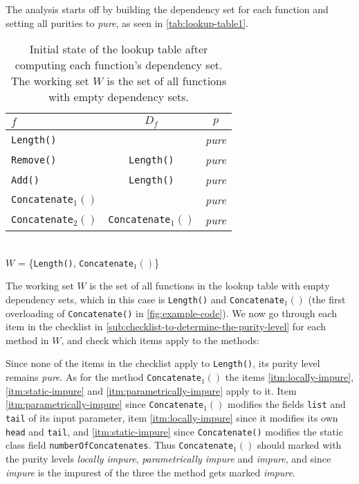 \documentclass[a4paper,12pt]{article}
\begin{document}
The analysis starts off by building the dependency set for each function and setting all purities to \textit{pure}, as seen in \autoref{tab:lookup-table1}.

\begin{table}[H]
  \caption{Initial state of the lookup table after computing each function's dependency set. The working set $W$ is the set of all functions with empty dependency sets.}
  \label{tab:lookup-table1}
  \centering
  \begin{tabular}{|l|c|c|}
    \hline
    $f$                         & $D_f$                     & $p$    \\ \hline
    \texttt{Length()}           &                           & \textit{pure} \\
    \texttt{Remove()}           & \texttt{Length()}         & \textit{pure} \\
    \texttt{Add()}              & \texttt{Length()}         & \textit{pure} \\
    \texttt{Concatenate$_1()$}   &                           & \textit{pure} \\
    \texttt{Concatenate$_2()$}   & \texttt{Concatenate$_1()$} & \textit{pure} \\ \hline
  \end{tabular}
  \\
  $W$ = \{\texttt{Length()}, \texttt{Concatenate$_1()$}\}
\end{table}

The working set $W$ is the set of all functions in the lookup table with empty dependency sets, which in this case is \texttt{Length()} and \texttt{Concatenate$_1()$} (the first overloading of \texttt{Concatenate()} in \autoref{fig:example-code}). We now go through each item in the checklist in \autoref{sub:checklist-to-determine-the-purity-level} for each method in $W$, and check which items apply to the methods:

Since none of the items in the checklist apply to \texttt{Length()}, its purity level remains \textit{pure}. As for the method \texttt{Concatenate$_1()$} the items \ref{itm:locally-impure}, \ref{itm:static-impure} and \ref{itm:parametrically-impure} apply to it. Item \ref{itm:parametrically-impure} since \texttt{Concatenate$_1()$} modifies the fields \texttt{list} and \texttt{tail} of its input parameter, item \autoref{itm:locally-impure} since it modifies its own \texttt{head} and \texttt{tail}, and \autoref{itm:static-impure} since \texttt{Concatenate()} modifies the static class field \texttt{numberOfConcatenates}. Thus \texttt{Concatenate$_1()$} should marked with the purity levels \textit{locally impure}, \textit{parametrically impure} and \textit{impure}, and since \textit{impure} is the impurest of the three the method gets marked \textit{impure}.
\end{document}

